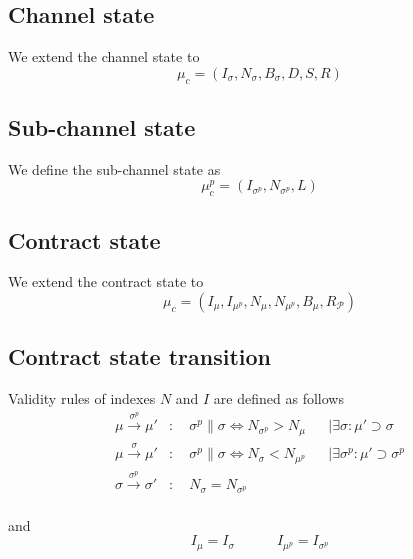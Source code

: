 \documentclass{llncs}
\begin{document}
\subsection{Channel state} We extend the channel state to
$$\mu_c = (I_\sigma,N_\sigma,B_\sigma,D,S,R)$$

\subsection{Sub-channel state} We define the sub-channel state as
$$\mu^p_c = (I_{\sigma^p},N_{\sigma^p},L)$$

\subsection{Contract state} We extend the contract state to
$$\mu_c = (I_\mu,I_{\mu^p},N_\mu,N_{\mu^p},B_\mu,R_\mathcal{P})$$

\subsection{Contract state transition} Validity rules of indexes $N$ and $I$ are defined as follows
\begin{align*}
    \mu \xrightarrow{\sigma^p} \mu' &: \quad \sigma^p \parallel \sigma \iff N_{\sigma^p} > N_\mu& &\mid \exists \sigma :  \mu' \supset \sigma \\
    \mu \xrightarrow{\sigma} \mu' &: \quad \sigma^p \parallel \sigma \iff N_{\sigma} < N_{\mu^p}& &\mid \exists \sigma^p : \mu' \supset \sigma^p \\
    \sigma \xrightarrow{\sigma^p} \sigma' &: \quad N_\sigma = N_{\sigma^p} && \\
\end{align*}

and
$$I_\mu = I_\sigma \quad\quad\quad  I_{\mu^p} = I_{\sigma^p}$$



%
%
\printbibliography
\end{document}
